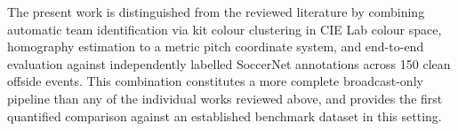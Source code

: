 The present work is distinguished from the reviewed literature by combining automatic team identification via kit colour clustering in CIE Lab colour space, homography estimation to a metric pitch coordinate system, and end-to-end evaluation against independently labelled SoccerNet annotations across 150 clean offside events. This combination constitutes a more complete broadcast-only pipeline than any of the individual works reviewed above, and provides the first quantified comparison against an established benchmark dataset in this setting.
